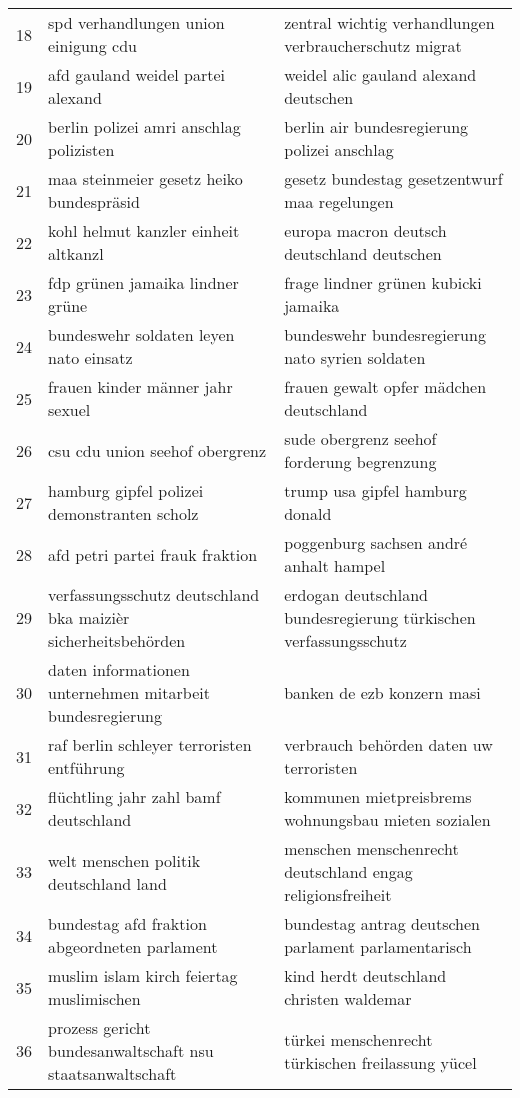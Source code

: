 \begin{table}[ht]
\begin{tabular}{lll}
  18 & spd verhandlungen union einigung cdu & zentral wichtig verhandlungen verbraucherschutz migrat \\ 
  19 & afd gauland weidel partei alexand & weidel alic gauland alexand deutschen \\ 
  20 & berlin polizei amri anschlag polizisten & berlin air bundesregierung polizei anschlag \\ 
  21 & maa steinmeier gesetz heiko bundespräsid & gesetz bundestag gesetzentwurf maa regelungen \\ 
  22 & kohl helmut kanzler einheit altkanzl & europa macron deutsch deutschland deutschen \\ 
  23 & fdp grünen jamaika lindner grüne & frage lindner grünen kubicki jamaika \\ 
  24 & bundeswehr soldaten leyen nato einsatz & bundeswehr bundesregierung nato syrien soldaten \\ 
  25 & frauen kinder männer jahr sexuel & frauen gewalt opfer mädchen deutschland \\ 
  26 & csu cdu union seehof obergrenz & sude obergrenz seehof forderung begrenzung \\ 
  27 & hamburg gipfel polizei demonstranten scholz & trump usa gipfel hamburg donald \\ 
  28 & afd petri partei frauk fraktion & poggenburg sachsen andré anhalt hampel \\ 
  29 & verfassungsschutz deutschland bka maizièr sicherheitsbehörden & erdogan deutschland bundesregierung türkischen verfassungsschutz \\ 
  30 & daten informationen unternehmen mitarbeit bundesregierung & banken de ezb konzern masi \\ 
  31 & raf berlin schleyer terroristen entführung & verbrauch behörden daten uw terroristen \\ 
  32 & flüchtling jahr zahl bamf deutschland & kommunen mietpreisbrems wohnungsbau mieten sozialen \\ 
  33 & welt menschen politik deutschland land & menschen menschenrecht deutschland engag religionsfreiheit \\ 
  34 & bundestag afd fraktion abgeordneten parlament & bundestag antrag deutschen parlament parlamentarisch \\ 
  35 & muslim islam kirch feiertag muslimischen & kind herdt deutschland christen waldemar \\ 
  36 & prozess gericht bundesanwaltschaft nsu staatsanwaltschaft & türkei menschenrecht türkischen freilassung yücel \\ 

\end{tabular}
\end{table}

